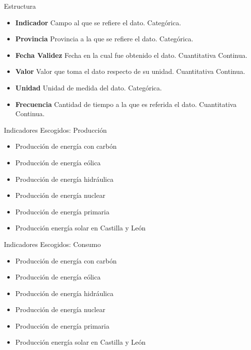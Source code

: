\documentclass{beamer}
\begin{document}
		\begin{frame}{Estructura}
		
			\begin{itemize}
			
				\item {\bf Indicador } Campo al que se refiere el dato. Categórica.
				
				\item {\bf Provincia } Provincia a la que se refiere el dato. Categórica.
				
				\item {\bf Fecha Validez } Fecha en la cual fue obtenido el dato. Cuantitativa Continua.
				
				\item {\bf Valor } Valor que toma el dato respecto de su unidad. Cuantitativa Continua.
				
				\item {\bf Unidad } Unidad de medida del dato. Categórica.
				
				\item {\bf Frecuencia } Cantidad de tiempo a la que es referida el dato. Cuantitativa Continua.
			\end{itemize}
		
		\end{frame}
		
		\begin{frame}{Indicadores Escogidos: Producción}
		
			\begin{itemize}
				\item Producción de energía con carbón
				\item Producción de energía eólica
				\item Producción de energía hidráulica
				\item Producción de energía nuclear
				\item Producción de energía primaria
				\item Producción energía solar en Castilla y León	
			\end{itemize}
				
		\end{frame}
		
		\begin{frame}{Indicadores Escogidos: Consumo}
		
			\begin{itemize}
				\item Producción de energía con carbón
				\item Producción de energía eólica
				\item Producción de energía hidráulica
				\item Producción de energía nuclear
				\item Producción de energía primaria
				\item Producción energía solar en Castilla y León
			\end{itemize}
							
		\end{frame}
		
\end{document}
